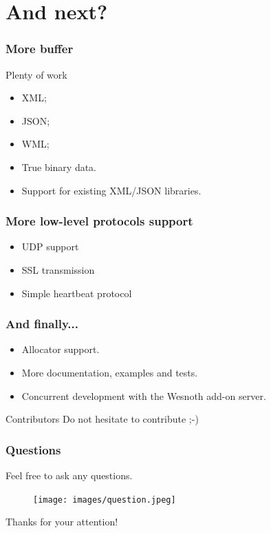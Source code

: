 \documentclass[xcolor=dvipsnames]{beamer}
\begin{document}
\section{And next?}

\begin{frame}
\frametitle{More buffer}

\begin{block}{Plenty of work}
\begin{itemize}
\item XML;
\item JSON;
\item WML;
\item True binary data.
\end{itemize}
\end{block}

\begin{itemize}
\item Support for existing XML/JSON libraries.
\end{itemize}
\end{frame}

\begin{frame}
\frametitle{More low-level protocols support}

\begin{itemize}
  \item UDP support
  \item SSL transmission
  \item Simple heartbeat protocol
\end{itemize}
\end{frame}

\begin{frame}
\frametitle{And finally...}

\begin{itemize}
  \item Allocator support.
  \item More documentation, examples and tests.
  \item Concurrent development with the Wesnoth add-on server.
\end{itemize}

\begin{exampleblock}{Contributors}
Do not hesitate to contribute ;-)
\end{exampleblock}
\end{frame}

\begin{frame}
\frametitle{Questions}
\begin{center}
\Large{Feel free to ask any questions.}
\end{center}
\begin{figure}[p]
  \centering
  \texttt{[image: images/question.jpeg]}
\end{figure}
\end{frame}

\begin{frame}
\begin{center}
\Large{Thanks for your attention!}
\end{center}
\end{frame}
\end{document}
